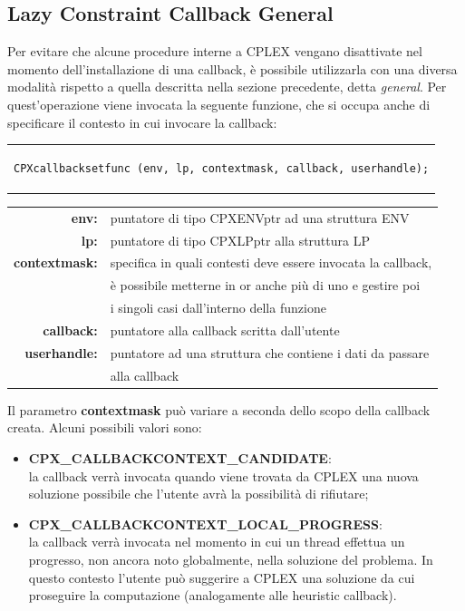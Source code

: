 \subsection{Lazy Constraint Callback General}%
Per evitare che alcune procedure interne a CPLEX vengano disattivate nel momento dell'installazione di una callback, è possibile utilizzarla con una diversa modalità rispetto a quella descritta nella sezione precedente, detta \textit{general}. Per quest'operazione viene invocata la seguente funzione, che si occupa anche di specificare il contesto in cui invocare la callback:
\begin{center}
\begin{tabular}{c}
\begin{lstlisting}[linewidth=382pt, basicstyle=\footnotesize\sffamily,]    
CPXcallbacksetfunc (env, lp, contextmask, callback, userhandle);
\end{lstlisting}
\end{tabular}
\end{center}
\begin{table}[h]
\centering
\begin{tabular}{rl}
\textbf{env:} & {puntatore di tipo CPXENVptr ad una struttura ENV}\\
\textbf{lp:} & {puntatore di tipo CPXLPptr alla struttura LP}\\
\textbf{contextmask:} & {specifica in quali contesti deve essere invocata la callback,}\\
&{è possibile metterne in or anche più di uno e gestire poi}\\
&{i singoli casi dall'interno della funzione}\\
\textbf{callback:} & {puntatore alla callback scritta dall'utente} \\
\textbf{userhandle:} & {puntatore ad una struttura che contiene i dati da passare} \\
&{alla callback}\\
\end{tabular}
\end{table}
Il parametro \textbf{contextmask} può variare a seconda dello scopo della callback creata. Alcuni possibili valori sono:
\begin{itemize}
\item{\textbf{CPX\_CALLBACKCONTEXT\_CANDIDATE}:\\la callback verrà invocata quando viene trovata da CPLEX una nuova soluzione possibile che l'utente avrà la possibilità di rifiutare;}
\item{\textbf{CPX\_CALLBACKCONTEXT\_LOCAL\_PROGRESS}: \\la callback verrà invocata nel momento in cui un thread effettua un progresso, non ancora noto globalmente, nella soluzione del problema. In questo contesto l'utente può suggerire a CPLEX una soluzione da cui proseguire la computazione (analogamente alle heuristic callback).}\\
\end{itemize}

